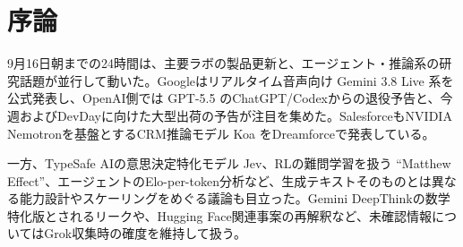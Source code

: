 \section*{序論}
9月16日朝までの24時間は、主要ラボの製品更新と、エージェント・推論系の研究話題が並行して動いた。Googleはリアルタイム音声向け Gemini 3.8 Live 系を公式発表し、OpenAI側では GPT-5.5 のChatGPT/Codexからの退役予告と、今週およびDevDayに向けた大型出荷の予告が注目を集めた。SalesforceもNVIDIA Nemotronを基盤とするCRM推論モデル Koa をDreamforceで発表している。

一方、TypeSafe AIの意思決定特化モデル Jev、RLの難問学習を扱う ``Matthew Effect''、エージェントのElo-per-token分析など、生成テキストそのものとは異なる能力設計やスケーリングをめぐる議論も目立った。Gemini DeepThinkの数学特化版とされるリークや、Hugging Face関連事案の再解釈など、未確認情報についてはGrok収集時の確度を維持して扱う。
